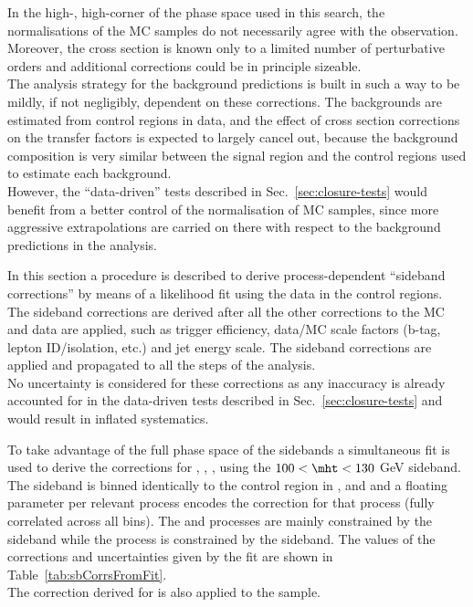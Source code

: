 In the high-\scalht, high-\etmiss corner of the phase space used in this search, the normalisations of the MC samples do not necessarily agree with the observation. 
Moreover, the cross section is known only to a limited number of perturbative orders and additional corrections could be in principle sizeable. \\
The analysis strategy for the background predictions is built in such a way to be mildly, if not negligibly, dependent on these corrections. 
The backgrounds are estimated from control regions in data, and the effect of cross section corrections on the transfer factors is expected to largely cancel out, 
because the background composition is very similar between the signal region and the control regions used to estimate each background. \\
However, the ``data-driven'' tests described in Sec.~\ref{sec:closure-tests} would benefit from a better control of the normalisation of MC samples, 
since more aggressive extrapolations are carried on there with respect to the background predictions in the analysis. 

In this section a procedure is described to derive process-dependent ``sideband corrections'' 
by means of a likelihood fit using the data in the control regions. 
The sideband corrections are derived after all the other corrections to the MC and data are applied, 
such as trigger efficiency, data/MC scale factors (b-tag, lepton ID/isolation, etc.) and jet energy scale. 
The sideband corrections are applied and propagated to all the steps of the analysis.\\
No uncertainty is considered for these corrections as any inaccuracy is already accounted 
for in the data-driven tests described in Sec.~\ref{sec:closure-tests} and would result in inflated systematics. 

To take advantage of the full phase space of the sidebands a simultaneous 
fit is used to derive the corrections for \wj, \zj, \ttbar, using the $100<\mht<130$ GeV sideband. 
The sideband is binned identically to the control region in \njet, \nb and \scalht and a floating 
parameter per relevant process encodes the correction for that process (fully correlated across all bins).
The \wj and \ttbar processes are mainly constrained by the \mj sideband while the \zj process is 
constrained by the \mmj sideband. The values of the corrections and uncertainties
given by the fit are shown in Table~\ref{tab:sbCorrsFromFit}.\\
The correction derived for \zj is also applied to the \znunu sample. 

